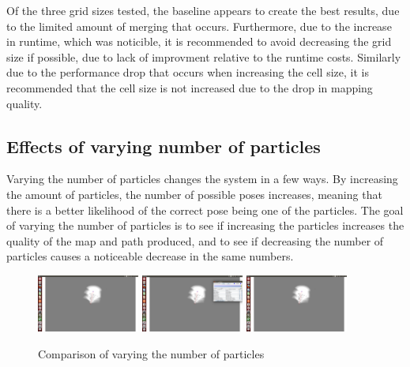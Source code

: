 \documentclass[10pt]{IEEEtran}
\begin{document}
Of the three grid sizes tested, the baseline appears to create the best results, due to
the limited amount of merging that occurs.  Furthermore, due to the increase in runtime,
which was noticible, it is recommended to avoid decreasing the grid size if possible, due
to lack of improvment relative to the runtime costs.  Similarly due to the performance drop
that occurs when increasing the cell size, it is recommended that the cell size
is not increased due to the drop in mapping quality.

\subsection{Effects of varying number of particles}
Varying the number of particles changes the system in a few ways.  By increasing the amount
of particles, the number of possible poses increases, meaning that there is a better
likelihood of the correct pose being one of the particles.  The goal of varying the
number of particles is to see if increasing the particles increases the quality of the 
map and path produced, and to see if decreasing the number of particles causes a noticeable
decrease in the same numbers.
\begin{figure}[t]
\centering
		\includegraphics[trim={25cm 15cm 20cm 7cm}, clip, width=0.3\textwidth]{Figures/part500}
		\includegraphics[trim={25cm 15cm 20cm 7cm}, clip, width=0.3\textwidth]{Figures/baseline1}
		\includegraphics[trim={25cm 15cm 20cm 7cm}, clip, width=0.3\textwidth]{Figures/part2000}
	\caption{Comparison of varying the number of particles}
	\label{fig:Particle Comparison}
\end{figure}
\end{document}
